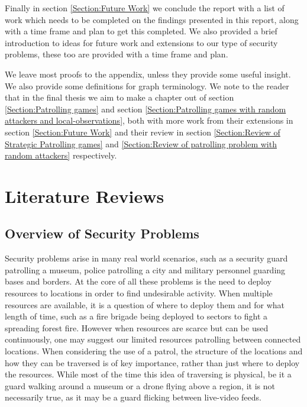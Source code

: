 \documentclass[a4paper,10pt]{article}
\theoremstyle{definition}
\theoremstyle{definition}
\theoremstyle{remark}
\theoremstyle{definition}
\begin{document}
{Finally in section \ref{Section:Future Work} we conclude the report with a list of work which needs to be completed on the findings presented in this report, along with a time frame and plan to get this completed. We also provided a brief introduction to ideas for future work and extensions to our type of security problems, these too are provided with a time frame and plan. 

We leave most proofs to the appendix, unless they provide some useful insight. We also provide some definitions for graph terminology. We note to the reader that in the final thesis we aim to make a chapter out of section \ref{Section:Patrolling games} and section \ref{Section:Patrolling games with random attackers and local-observations}, both with more work from their extensions in section \ref{Section:Future Work} and their review in section \ref{Section:Review of Strategic Patrolling games} and \ref{Section:Review of patrolling problem with random attackers} respectively.
}
\clearpage
\pagestyle{plain}


\setlength{\parindent}{0pt}
\setlength{\parskip}{1em}

\newpage
{}

\section{Literature Reviews}
\label{Section:Literature Reviews}
\subsection{Overview of Security Problems}
Security problems arise in many real world scenarios, such as a security guard patrolling a museum, police patrolling a city and military personnel guarding bases and borders. At the core of all these problems is the need to deploy resources to locations in order to find undesirable activity. When multiple resources are available, it is a question of where to deploy them and for what length of time, such as a fire brigade being deployed to sectors to fight a spreading forest fire. However when resources are scarce but can be used continuously, one may suggest our limited resources patrolling between connected locations. When considering the use of a patrol, the structure of the locations and how they can be traversed is of key importance, rather than just where to deploy the resources. While most of the time this idea of traversing is physical, be it a guard walking around a museum or a drone flying above a region, it is not necessarily true, as it may be a guard flicking between live-video feeds.
\end{document}

